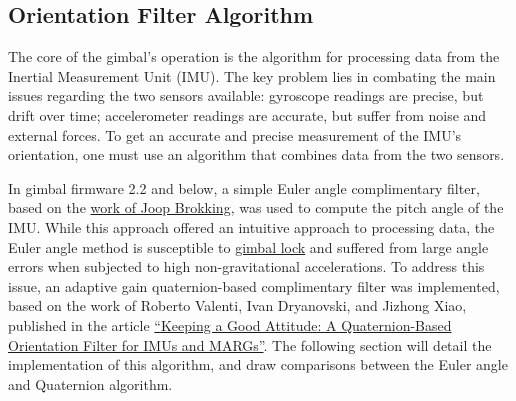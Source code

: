 \documentclass[11pt]{article} %
\begin{document}
\subsection{Orientation Filter Algorithm}

The core of the gimbal's operation is the algorithm for processing data from the Inertial Measurement Unit (IMU). The key problem lies in combating the main issues regarding the two sensors available: gyroscope readings are precise, but drift over time; accelerometer readings are accurate, but suffer from noise and external forces. To get an accurate and precise measurement of the IMU's orientation, one must use an algorithm that combines data from the two sensors. 

In gimbal firmware 2.2 and below, a simple Euler angle complimentary filter, based on the \href{http://www.brokking.net/imu.html}{work of Joop Brokking},    was used to compute the pitch angle of the IMU. While this approach offered an intuitive approach to processing data, the Euler angle method is susceptible to \href{https://en.wikipedia.org/wiki/Gimbal_lock}{gimbal lock} and suffered from large angle errors when subjected to high non-gravitational accelerations. To address this issue, an adaptive gain quaternion-based complimentary filter was implemented, based on the work of Roberto Valenti, Ivan Dryanovski, and Jizhong Xiao, published in the article \href{http://www.mdpi.com/1424-8220/15/8/19302}{``Keeping a Good Attitude: A Quaternion-Based Orientation Filter for IMUs and MARGs''}. The following section will detail the implementation of this algorithm, and draw comparisons between the Euler angle and Quaternion algorithm.

\newpage
\end{document}
